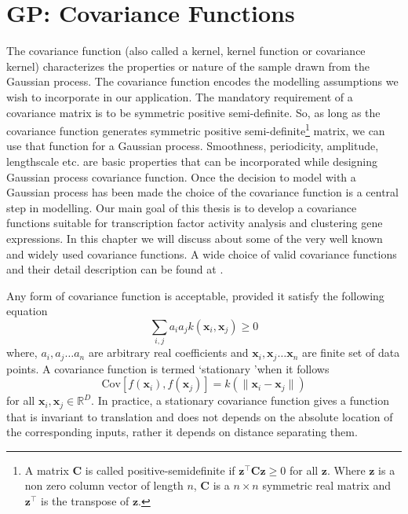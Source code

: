 \section{GP: Covariance Functions}
The covariance function (also called a kernel, kernel function or covariance kernel) characterizes the properties or nature of the sample drawn from the Gaussian process. The covariance function encodes the modelling assumptions we wish to incorporate in our application. The mandatory requirement of a covariance matrix is to be symmetric positive semi-definite. So, as long as the covariance function generates symmetric positive semi-definite\footnote{A matrix $\textbf{C}$ is called positive-semidefinite if $\textbf{z}^{\top}\textbf{C}\textbf{z} \geq 0$ for all $\textbf{z}$. Where $\textbf{z}$ is a non zero column vector of length $n$, $\textbf{C}$ is a $n\times n$ symmetric real matrix and $\textbf{z}^{\top}$ is the transpose of $\textbf{z}$.} matrix, we can use that function for a Gaussian process. Smoothness, periodicity, amplitude, lengthscale etc. are basic properties that can be incorporated while designing Gaussian process covariance function. Once the decision to model with a Gaussian process has been made the choice of the covariance function is a central step in modelling. Our main goal of this thesis is to develop a covariance functions suitable for transcription factor activity analysis and clustering gene expressions. In this chapter we will discuss about some of the very well known and widely used covariance functions. A wide choice of valid covariance functions and their detail description can be found at \cite{Rasmussen_and_Williams:2006}.

Any form of covariance function is acceptable, provided it satisfy the following equation
\begin{equation} \label{eq:cov_basic}
\sum_{i,j} a_i a_j k\left(\textbf{x}_i,\textbf{x}_j\right)\geq 0
\end{equation}
where, $a_i, a_j \dots a_n$ are arbitrary real coefficients and $\textbf{x}_i, \textbf{x}_j \dots \textbf{x}_n$ are finite set of data points. A covariance function is termed \lq stationary \rq when it follows
\begin{equation} \label{eq:cov_stationary}
\text{Cov}\left[f\left(\textbf{x}_i\right),f\left(\textbf{x}_j\right)\right] = k\left( \lVert \textbf{x}_i -\textbf{x}_j \rVert \right)
\end{equation}
for all $\textbf{x}_i,\textbf{x}_j \in \mathbb{R}^D$. In practice, a stationary covariance function  gives a function that is invariant to translation and does not depends on the absolute location of the corresponding inputs, rather it depends on distance separating them. 

